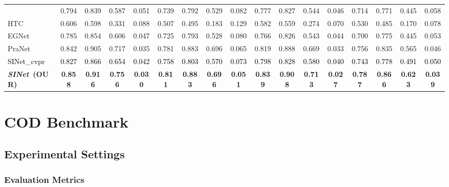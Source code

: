 \documentclass[10pt,journal,compsoc]{IEEEtran}
\newcommand{\Rev}[1]{\textcolor{black}{#1}}
\def\ournewmodel{\emph{SINet}}
\begin{document}
\begin{table*}[t!]
\begin{tabular}{l|cccc||cccc||cccc||cccc}
    & 0.794 & 0.839 & 0.587 & 0.051 & 0.739 & 0.792 & 0.529 & 0.082 
    & 0.777 & 0.827 & 0.544 & 0.046 & 0.714 & 0.771 & 0.445 & 0.058\\
    HTC~\cite{chen2019hybrid} 
    & 0.606 & 0.598 & 0.331 & 0.088 & 0.507 & 0.495 & 0.183 & 0.129 
    & 0.582 & 0.559 & 0.274 & 0.070 & 0.530 & 0.485 & 0.170 & 0.078\\
    EGNet~\cite{zhao2019EGNet} 
    & 0.785 & 0.854 & 0.606 & 0.047 & 0.725 & 0.793 & 0.528 & 0.080 
    & 0.766 & 0.826 & 0.543 & 0.044 & 0.700 & 0.775 & 0.445 & 0.053\\
    PraNet~\cite{fan2020pranet} 
    & 0.842 & 0.905 & 0.717 & 0.035 & 0.781 & 0.883 & 0.696 & 0.065 
    & 0.819 & 0.888 & 0.669 & 0.033 & 0.756 & 0.835 & 0.565 & 0.046\\
    \hline
    \Rev{SINet\_cvpr~\cite{fan2020camouflaged}}     
    & \Rev{0.827} & \Rev{0.866} & \Rev{0.654} & \Rev{0.042} & \Rev{0.758} & \Rev{0.803} & \Rev{0.570} & \Rev{0.073} & \Rev{0.798} & \Rev{0.828} & \Rev{0.580} & \Rev{0.040} & \Rev{0.743} & \Rev{0.778} & \Rev{0.491} & \Rev{0.050} \\
    \rowcolor{mygray}
    \textbf{\ournewmodel~(OUR)} 
    & \textbf{0.858} & \textbf{0.916} & \textbf{0.756} & \textbf{0.030} 
    & \textbf{0.811} & \textbf{0.883} & \textbf{0.696} & \textbf{0.051} 
    & \textbf{0.839} & \textbf{0.908} & \textbf{0.713} & \textbf{0.027} 
    & \textbf{0.787} & \textbf{0.866} & \textbf{0.623} & \textbf{0.039}
    \\ \bottomrule
  \end{tabular}
\end{table*}


\section{COD Benchmark}\label{sec:benchmark}

\subsection{Experimental Settings}\label{sec:benchmarkSetup}

\subsubsection{Evaluation Metrics}
\end{document}

